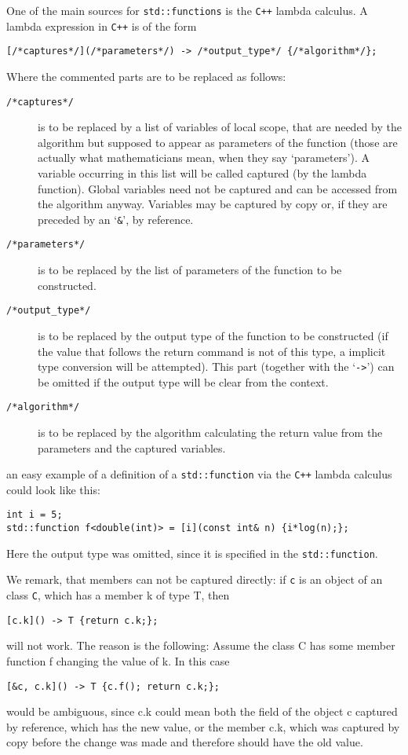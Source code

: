 \documentclass{article}
\newcommand{\cc}{\texttt{C++}\xspace}
\newcommand{\code}[1]{\texttt{#1}}
\begin{document}
One of the main sources for \code{std::functions} is the \cc lambda calculus. A lambda expression in \cc is of the form
\begin{lstlisting}
[/*captures*/](/*parameters*/) -> /*output_type*/ {/*algorithm*/};
\end{lstlisting}
Where the commented parts are to be replaced as follows:
\begin{description}
\item[\textcolor{commentgray}{\code{/*captures*/}}] is to be replaced by a list of variables of local scope, that are needed by the algorithm but supposed to appear as parameters of the function (those are actually what mathematicians mean, when they say \lq parameters\rq). A variable occurring in this list will be called captured (by the lambda function). Global variables need not be captured and can be accessed from the algorithm anyway. Variables may be captured by copy or, if they are preceded by an \lq\code{\&}\rq, by reference.
\item[\textcolor{commentgray}{\code{/*parameters*/}}] is to be replaced by the list of parameters of the function to be constructed.
\item[\textcolor{commentgray}{\code{/*output\_type*/}}] is to be replaced by the output type of the function to be constructed (if the value that follows the return command is not of this type, a implicit type conversion will be attempted). This part (together with the \lq\code{->}\rq) can be omitted if the output type will be clear from the context.
\item[\textcolor{commentgray}{\code{/*algorithm*/}}] is to be replaced by the algorithm calculating the return value from the parameters and the captured variables.
\end{description}
an easy example of a definition of a \code{std::function} via the \cc lambda calculus could look like this:
\begin{lstlisting}
int i = 5;
std::function f<double(int)> = [i](const int& n) {i*log(n);};
\end{lstlisting}
Here the output type was omitted, since it is specified in the \code{std::function}.

We remark, that members can not be captured directly: if \code c is an object of an class \code C, which has a member k of type T, then
\begin{lstlisting}
[c.k]() -> T {return c.k;};
\end{lstlisting}
will not work. The reason is the following: Assume the class C has some member function f changing the value of k. In this case
\begin{lstlisting}
[&c, c.k]() -> T {c.f(); return c.k;};
\end{lstlisting}
would be ambiguous, since c.k could mean both the field of the object c captured by reference, which has the new value, or the member c.k, which was captured by copy before the change was made and therefore should have the old value.
\end{document}
